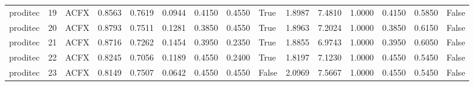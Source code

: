 \begin{tabular}{lrlrrrrrlrrrrrl}
proditec &     19 &   ACFX &      0.8563 &    0.7619 &       0.0944 &                 0.4150 &           0.4550 &            True &       1.8987 &                  7.4810 &                              1.0000 &         0.4150 &                0.5850 &                 False \\
proditec &     20 &   ACFX &      0.8793 &    0.7511 &       0.1281 &                 0.3850 &           0.4550 &            True &       1.8963 &                  7.2024 &                              1.0000 &         0.3850 &                0.6150 &                 False \\
proditec &     21 &   ACFX &      0.8716 &    0.7262 &       0.1454 &                 0.3950 &           0.2350 &            True &       1.8855 &                  6.9743 &                              1.0000 &         0.3950 &                0.6050 &                 False \\
proditec &     22 &   ACFX &      0.8245 &    0.7056 &       0.1189 &                 0.4550 &           0.2400 &            True &       1.8197 &                  7.1230 &                              1.0000 &         0.4550 &                0.5450 &                 False \\
proditec &     23 &   ACFX &      0.8149 &    0.7507 &       0.0642 &                 0.4550 &           0.4550 &           False &       2.0969 &                  7.5667 &                              1.0000 &         0.4550 &                0.5450 &                 False \\
\bottomrule
\end{tabular}
